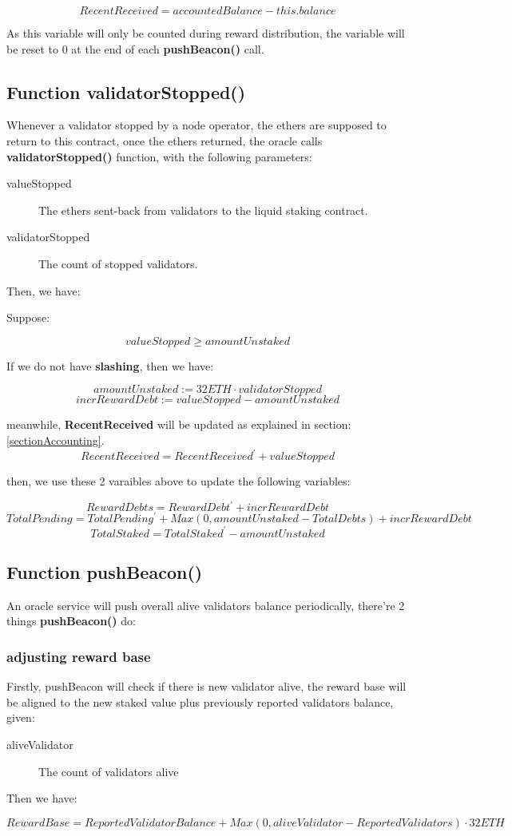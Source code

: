 \documentclass{article}
\begin{document}
\[RecentReceived = accountedBalance - this.balance\]

As this variable will only be counted during reward distribution, the variable will be reset to 0 at the end of each \textbf{pushBeacon()} call.

\subsection{Function validatorStopped()}
Whenever a validator stopped by a node operator, the ethers are supposed to return to this contract, once the ethers returned, the oracle calls \textbf{validatorStopped()} function, with the following parameters:
\begin{description}
\item[valueStopped] The ethers sent-back from validators to the liquid staking contract.
\item[validatorStopped] The count of stopped validators.
\end{description}
Then, we have:

\begin{theorem}[validatorStopped]
\label{validatorStopped}
Suppose:

\[valueStopped \geq amountUnstaked \]

If we do not have \textbf{slashing}, then we have:

\[amountUnstaked := 32 ETH \cdot validatorStopped\]
\[incrRewardDebt := valueStopped - amountUnstaked\]

meanwhile, \textbf{RecentReceived} will be updated as explained in section:\ref{sectionAccounting}.
\[RecentReceived = RecentReceived^{\prime} + valueStopped\]

then, we use these 2 varaibles above to update the following variables:

\[RewardDebts = RewardDebt^{\prime} + incrRewardDebt\]
\[TotalPending = TotalPending^{\prime} + Max(0, amountUnstaked - TotalDebts) + incrRewardDebt\]
\[TotalStaked = TotalStaked^{\prime} -  amountUnstaked \]
\end{theorem}

\subsection{Function pushBeacon()}
An oracle service will push overall alive validators balance periodically, there're 2 things \textbf{pushBeacon()} do:
\subsubsection{adjusting reward base}
Firstly, pushBeacon will check if there is new validator alive, the reward base will be aligned to the new staked value plus previously reported validators balance, given:
\begin{description}
\item[aliveValidator] The count of validators alive
\end{description}
Then we have:
\begin{theorem}[pushBeacon]
\label{pushBeacon}
\[RewardBase = ReportedValidatorBalance + Max(0, aliveValidator - ReportedValidators) \cdot  32 ETH\]
\end{theorem}
\end{document}
